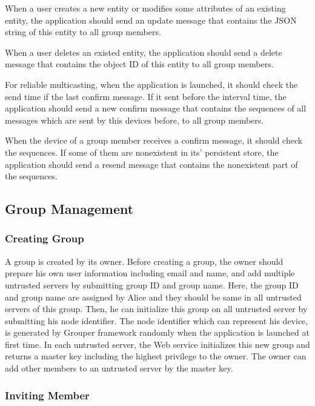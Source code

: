 \documentclass[twocolumn,10pt]{article}
\begin{document}
When a user creates a new entity or modifies some attributes of an existing entity, the application should send an update message that contains the JSON string of this entity to all group members.

When a user deletes an existed entity, the application should send a delete message that contains the object ID of this entity to all group members.

For reliable multicasting, when the application is launched, it should check the send time if the last confirm message. If it sent before the interval time, the application should send a new confirm message that contains the sequences of all messages which are sent by this devices before, to all group members.

When the device of a group member receives a confirm message, it should check the sequences. If some of them are nonexistent in its' persistent store, the application should send a resend message that contains the nonexistent part of the sequences.

\subsection{Group Management}

\subsubsection{Creating Group}

A group is created by its owner. Before creating a group, the owner should prepare his own user information including email and name, and add multiple untrusted servers by submitting group ID and group name. Here, the group ID and group name are assigned by Alice and they should be same in all untrusted servers of this group. Then, he can initialize this group on all untrusted server by submitting his node identifier. The node identifier which can represent his device, is generated by Grouper framework randomly when the application is launched at first time. In each untrusted server, the Web service initializes this new group and returns a master key including the highest privilege to the owner. The owner can add other members to an untrusted server by the master key.

\subsubsection{Inviting Member}
\end{document}
